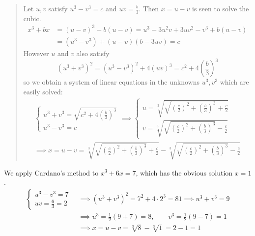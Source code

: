 \begin{quote}
	Let $u,v$ satisfy $u^3-v^3=c$ and $uv=\frac{b}{3}$.
	Then $x=u-v$ is seen to solve the cubic.
	\begin{align*}
		x^3+bx&=(u-v)^3+b(u-v)=u^3-3u^2v+3uv^2-v^3+b(u-v)\\
		&=(u^3-v^3)+(u-v)(b-3uv)=c
	\end{align*}
	However $u$ and $v$ also satisfy
	\[
		(u^3+v^3)^2=(u^3-v^3)^2+4(uv)^3=c^2+4\left(\frac{b}{3}\right)^3
	\]
	so we obtain a system of linear equations in the unknowns $u^3,v^3$ which are easily solved:
	\begin{gather*}
		\begin{cases}
			u^3+v^3=\sqrt{c^2+4\left(\frac{b}{3}\right)^3}\\
			u^3-v^3=c
		\end{cases}
		\implies
		\begin{cases}
			u=\sqrt[3]{\sqrt{\left(\frac c2\right)^2+\left(\frac{b}{3}\right)^3}+\frac c2}\\
			v=\sqrt[3]{\sqrt{\left(\frac c2\right)^2+\left(\frac{b}{3}\right)^3}-\frac c2}
		\end{cases}
		\\
		\implies x=u-v
		=\sqrt[3]{
			\sqrt{\left(\frac c2\right)^2+\left(\frac{b}{3}\right)^3} +\frac c2
		}
		-\sqrt[3]{
			\sqrt{\left(\frac c2\right)^2+\left(\frac{b}{3}\right)^3} -\frac c2
		}
	\end{gather*}
\end{quote}

\exstart We apply Cardano's method to $x^3+6x=7$, which has the obvious solution $x=1$.
	\begin{align*}
		\begin{cases}
			u^3-v^3=7\\
			uv=\frac 63=2
		\end{cases}\ 
		&\implies (u^3+v^3)^2=7^2+4\cdot 2^3=81 \implies u^3+v^3=9\\[-5pt]
		&\implies u^3=\frac 12(9+7)=8,\qquad v^3=\frac 12(9-7)=1\\
		&\implies x=u-v=\sqrt[3]{8}-\sqrt[3]{1} =2-1=1
	\end{align*}

